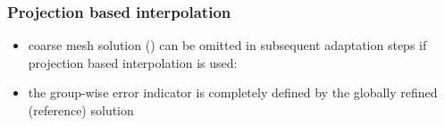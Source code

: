 \begin{frame}[c]
	\frametitle{Projection based interpolation}
	\begin{itemize}\addtolength{\itemsep}{.5\baselineskip}
		\item coarse mesh solution () can be omitted in subsequent adaptation steps if \alert{projection based interpolation} is used:\\[1em]
		\item the group-wise error indicator  is completely defined by the globally refined (reference) solution
	\end{itemize}
\end{frame}
